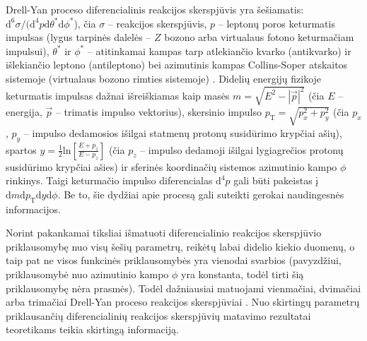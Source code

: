 \documentclass[a4paper, 12pt, oneside]{article}
\newcommand{\pT}{p_{\mathrm{T}}}
\newlength\q
\begin{document}
Drell-Yan proceso diferencialinis reakcijos skerspjūvis yra šešiamatis:
$\mathrm{d}^6\sigma/(\mathrm{d}^4p\mathrm{d}\theta^*\mathrm{d}\phi^*$), čia $\sigma$ -- reakcijos skerspjūvis,
$p$ -- leptonų poros keturmatis impulsas (lygus tarpinės dalelės -- $Z$ bozono arba virtualaus fotono keturmačiam
impulsui), $\theta^*$ ir $\phi^*$ -- atitinkamai kampas tarp atlekiančio kvarko (antikvarko) ir išlekiančio leptono (antileptono)
bei azimutinis kampas Collins-Soper atskaitos sistemoje (virtualaus bozono rimties sistemoje) \cite{DYangular}.
Didelių energijų fizikoje keturmatis impulsas dažnai išreiškiamas kaip masės $m=\sqrt{E^2-|\vec{p}|^2}$ (čia $E$ -- energija,
$\vec{p}$ -- trimatis impulso vektorius), skersinio impulso $\pT=\sqrt{p_x^2+p_y^2}$ (čia $p_x$, $p_y$ -- impulso dedamosios
išilgai statmenų protonų susidūrimo krypčiai ašių), spartos $y=\frac{1}{2}\mathrm{ln}[\frac{E+p_z}{E-p_z}]$ (čia $p_z$ -- impulso dedamoji
išilgai lygiagrečios protonų susidūrimo krypčiai ašies) ir
sferinės koordinačių sistemos azimutinio kampo $\phi$ rinkinys.
Taigi keturmačio impulso diferencialas $\mathrm{d}^4p$ gali būti pakeistas į $\mathrm{d}m\mathrm{d}\pT\mathrm{d}y\mathrm{d}\phi$.
Be to, šie dydžiai apie procesą gali suteikti gerokai naudingesnės informacijos.

Norint pakankamai tiksliai išmatuoti diferencialinio reakcijos skerspjūvio priklausomybę nuo visų šešių parametrų,
reikėtų labai didelio kiekio duomenų, o taip pat ne visos funkcinės priklausomybės yra vienodai svarbios (pavyzdžiui,
priklausomybė nuo azimutinio kampo $\phi$ yra konstanta, todėl tirti šią priklausomybę nėra prasmės).
Todėl dažniausiai matuojami vienmačiai, dvimačiai arba trimačiai Drell-Yan proceso reakcijos skerspjūviai
\cite{DY_CMS2011, DY_CMS2013, DY_ATLAS2013, DY_ATLAS2014, DY_CMS2015, DY_ATLAS2016, DY_ATLAS2017, DY_CMS2019}.
Nuo skirtingų parametrų priklausančių diferencialinių reakcijos skerspjūvių matavimo rezultatai teoretikams teikia
skirtingą informaciją.
\end{document}
